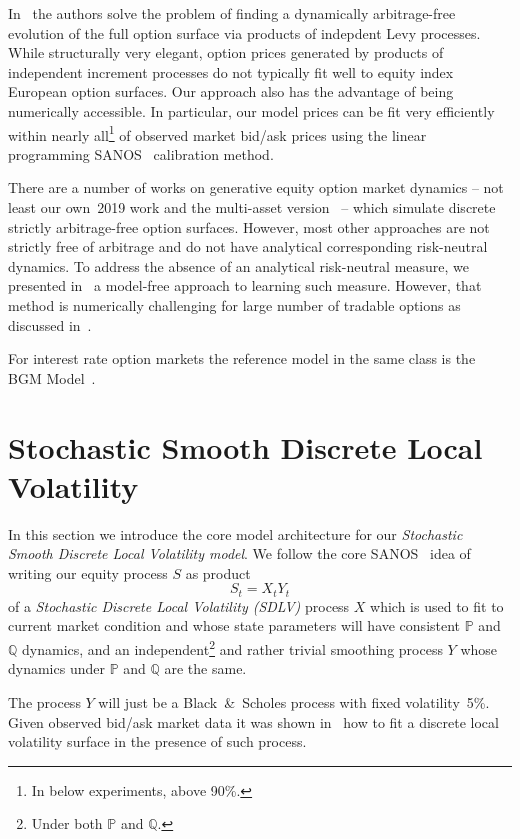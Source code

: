 \documentclass[11pt]{article}
\newcommand{\Q}{\mathbb Q}
\newcommand{\PP}{\mathbb P}
\theoremstyle{plain}
\theoremstyle{definition}
\theoremstyle{remark}
\begin{document}
In~\cite{TANGET} the 
authors solve the problem of finding a dynamically arbitrage-free evolution of the full option surface via products of indepdent Levy processes. While structurally
very elegant, option prices generated by products of independent increment processes do not typically fit well to equity index European option surfaces. 
Our approach also has the advantage of being numerically accessible.
In particular, our model prices can be fit very efficiently within nearly all\footnote{In below experiments, above 90\%.} of observed market bid/ask prices
using the  linear programming SANOS~\cite{SANOS2026} calibration method.

There are a number of works on generative equity option market dynamics -- not least our
own~2019 work \cite{WieseEtAl2019OptionMarkets} and the multi-asset version~\cite{WieseEtAl2021MultiAsset} -- which simulate
discrete strictly arbitrage-free option surfaces. However, most other approaches
are not strictly free of arbitrage and do not have analytical corresponding risk-neutral dynamics.
To address the absence of an analytical risk-neutral measure, we presented in~ \cite{removedrift} 
a model-free approach
to learning such measure. However,  that method is numerically challenging
for large number of tradable options as discussed in~\cite{DYSANOS2026}.

For interest rate option markets the reference model in the same class is the BGM Model~\cite{BGM}.

\section{Stochastic Smooth Discrete Local Volatility}

In this section we introduce the core model architecture for our \emph{Stochastic 
Smooth Discrete Local Volatility model}.
We follow the core SANOS~\cite{SANOS2026} idea of writing our equity process $S$ as product
\begin{equation}
\label{eq:S} 
S_t = X_t Y_t 
\end{equation}
of a \emph{Stochastic Discrete Local Volatility (SDLV)} process $X$ which is used to fit to current market condition and 
whose state parameters will have consistent $\PP$ and $\Q$ dynamics, and an independent\footnote{Under both $\PP$ and $\Q$.} and rather trivial smoothing process $Y$ whose dynamics under $\PP$ and $\Q$ are the same.

The process $Y$ will just be a Black~\&~Scholes process with fixed volatility~5\%. Given observed bid/ask market data it was shown in~\cite{SANOS2026} how to fit
a discrete local volatility surface in the presence of such process. 
\end{document}
